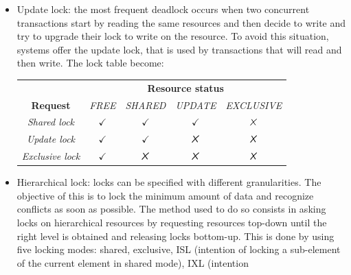 \documentclass[12pt, a4paper]{report}
\begin{document}
    \begin{itemize}
        \item Update lock: the most frequent deadlock occurs when two concurrent transactions start by reading the same resources and then decide to write and try to upgrade their 
        lock to write on the resource. To avoid this situation, systems offer the update lock, that is used by transactions that will read and then write. The lock table become: 
        \begin{table}[H]
            \centering
            \begin{tabular}{ccccc}
            \textbf{}                                     & \multicolumn{4}{c}{\textbf{Resource status}}                                                                                                        \\ \cline{2-5} 
            \multicolumn{1}{c|}{\textbf{Request}}         & \textit{FREE}                     & \textit{SHARED}                   & \textit{UPDATE}                   & \multicolumn{1}{c|}{\textit{EXCLUSIVE}} \\ \hline
            \multicolumn{1}{|c|}{\textit{Shared lock}}    & \multicolumn{1}{c|}{$\checkmark$} & \multicolumn{1}{c|}{$\checkmark$} & \multicolumn{1}{c|}{$\checkmark$} & \multicolumn{1}{c|}{$\tikzxmark$}       \\ \hline
            \multicolumn{1}{|c|}{\textit{Update lock}}    & \multicolumn{1}{c|}{$\checkmark$} & \multicolumn{1}{c|}{$\checkmark$} & \multicolumn{1}{c|}{$\tikzxmark$} & \multicolumn{1}{c|}{$\tikzxmark$}       \\ \hline
            \multicolumn{1}{|c|}{\textit{Exclusive lock}} & \multicolumn{1}{c|}{$\checkmark$} & \multicolumn{1}{c|}{$\tikzxmark$} & \multicolumn{1}{c|}{$\tikzxmark$} & \multicolumn{1}{c|}{$\tikzxmark$}       \\ \hline
            \end{tabular}
        \end{table}
        \item Hierarchical lock: locks can be specified with different granularities. The objective of this is to lock the minimum amount of data and recognize conflicts as soon as
        possible. The method used to do so consists in asking locks on hierarchical resources by requesting resources top-down until the right level is obtained and releasing 
        locks bottom-up. This is done by using five locking modes: shared, exclusive, ISL (intention of locking a sub-element of the current element in shared mode), IXL (intention 

\end{itemize}
\end{document}
